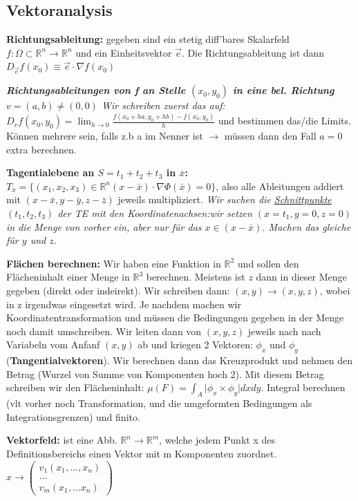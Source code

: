 \documentclass[a3paper, ngerman, 8pt]{article}
\begin{document}
\begin{multicols*}{3}
\subsection*{Vektoranalysis}
\textbf{Richtungsableitung:} gegeben sind ein stetig diff'bares Skalarfeld 
$ f: \Omega \subset \mathbb{R}^n \to \mathbb{R}^n$ und ein Einheitsvektor 
$\vec{e}$. Die Richtungsableitung ist dann $D_{\vec{e}}f(x_0)\equiv\vec{e} \cdot \nabla f(x_0)$

\textit{\textbf{Richtungsableitungen von f an Stelle $(x_0,y_0)$ in eine bel. Richtung $v=(a,b)\neq (0,0)$} Wir schreiben zuerst das auf: $D_vf(x_0, y_0)=\lim_{h \to 0}\frac{f(x_0+ha, y_0+hb)-f(x_0, y_0)}{h}$} und bestimmen das/die Limits. Können mehrere sein, falls z.b a im Nenner ist $\to$ müssen dann den Fall $a=0$ extra berechnen. 

\textbf{Tagentialebene an $S=t_1+t_2+t_3$  in $\bar{x}$:} $T_{\bar{x}} = \{(x_1, x_2, x_3)\in \mathbb{R}^n (x-\bar{x})\cdot \nabla \Phi(\bar{x})=0\}$, also alle Ableitungen addiert mit $ (x-\bar{x}, y-\bar{y}, z-\bar{z})$ jeweils multipliziert. \textit{Wir suchen die \underline{Schnittpunkte $(t_1, t_2, t_3)$} der TE mit den Koordinatenachsen:wir setzen $(x=t_1, y=0, z=0)$ in die Menge von vorher ein, aber nur für das $x\in(x-\bar{x})$. Machen das gleiche für $y$ und $z$. }

\textbf{Flächen berechnen:} Wir haben eine Funktion in $\mathbb{R}^2$ und sollen den Flächeninhalt einer Menge in $\mathbb{R}^3$ berechnen. Meistens ist $z$ dann in dieser Menge gegeben (direkt oder indeirekt). Wir schreiben dann: $(x,y) \to (x,y,z)$, wobei in z irgendwas eingesetzt wird. Je nachdem machen wir Koordinatentransformation und müssen die Bedingungen gegeben in der Menge noch damit umschreiben. Wir leiten dann von $(x,y,z)$ jeweils nach nach Variabeln vom Anfanf $(x,y)$ ab und kriegen 2 Vektoren: $\phi_x$ und $\phi_y$ (\textbf{Tangentialvektoren}). Wir berechnen dann das Kreuzprodukt und nehmen den Betrag (Wurzel von Summe von Komponenten hoch 2). Mit diesem Betrag schreiben wir den Flächeninhalt: $\mu (F)= \int_{A} \vert \phi_x \times \phi_y \vert dxdy$. Integral berechnen (vlt vorher noch Transformation, und die umgeformten Bedingungen als Integrationsgrenzen) und finito.

\textbf{Vektorfeld:} ist eine Abb. $\mathbb{R}^n \to \mathbb{R}^m$, welche jedem Punkt x des Definitionsbereichs einen Vektor mit m Komponenten zuordnet. $x \to \begin{pmatrix}
v_1(x_1, ..., x_n) \\
...\\
v_m(x_1, ... x_n)
\end{pmatrix}$


\end{multicols*}
\end{document}

